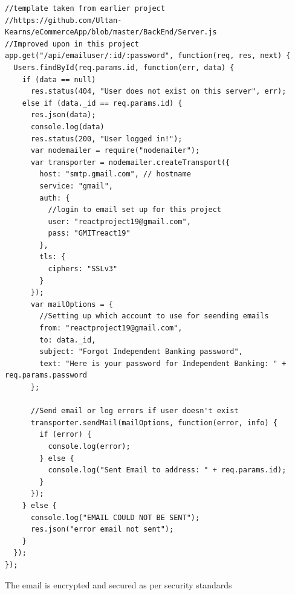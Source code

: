 \begin{verbatim}
//template taken from earlier project
//https://github.com/Ultan-Kearns/eCommerceApp/blob/master/BackEnd/Server.js
//Improved upon in this project
app.get("/api/emailuser/:id/:password", function(req, res, next) {
  Users.findById(req.params.id, function(err, data) {
    if (data == null)
      res.status(404, "User does not exist on this server", err);
    else if (data._id == req.params.id) {
      res.json(data);
      console.log(data)
      res.status(200, "User logged in!");
      var nodemailer = require("nodemailer");
      var transporter = nodemailer.createTransport({
        host: "smtp.gmail.com", // hostname
        service: "gmail",
        auth: {
          //login to email set up for this project
          user: "reactproject19@gmail.com",
          pass: "GMITreact19"
        },
        tls: {
          ciphers: "SSLv3"
        }
      });
      var mailOptions = {
        //Setting up which account to use for seending emails
        from: "reactproject19@gmail.com",
        to: data._id,
        subject: "Forgot Independent Banking password",
        text: "Here is your password for Independent Banking: " + req.params.password
      };

      //Send email or log errors if user doesn't exist
      transporter.sendMail(mailOptions, function(error, info) {
        if (error) {
          console.log(error);
        } else {
          console.log("Sent Email to address: " + req.params.id);
        }
      });
    } else {
      console.log("EMAIL COULD NOT BE SENT");
      res.json("error email not sent");
    }
  });
});
\end{verbatim}
The email is encrypted and secured as per security standards
